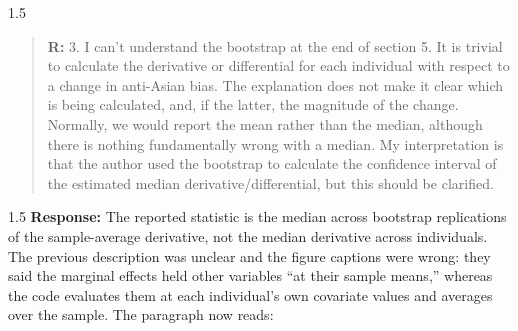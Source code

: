 \documentclass[12pt,english]{article}
\newcommand{\rrxspc}{1.5}
\begin{document}
\begin{refsection}
    \begin{spacing}{\rrxspc}
            \begin{quotation}
                \textbf{R: } 3. I can't understand the bootstrap at the end of section 5. It is trivial to calculate the derivative or differential for each individual with respect to a change in anti-Asian bias. The explanation does not make it clear which is being calculated, and, if the latter, the magnitude of the change. Normally, we would report the mean rather than the median, although there is nothing fundamentally wrong with a median. My interpretation is that the author used the bootstrap to calculate the confidence interval of the estimated median derivative/differential, but this should be clarified.
            \end{quotation}
    \end{spacing}
    \begin{spacing}{\rrxspc}
        \textbf{Response:} The reported statistic is the median across bootstrap replications of the sample-average derivative, not the median derivative across individuals. The previous description was unclear and the figure captions were wrong: they said the marginal effects held other variables ``at their sample means,'' whereas the code evaluates them at each individual's own covariate values and averages over the sample. The paragraph now reads:

\end{spacing}
\end{refsection}
\end{document}
